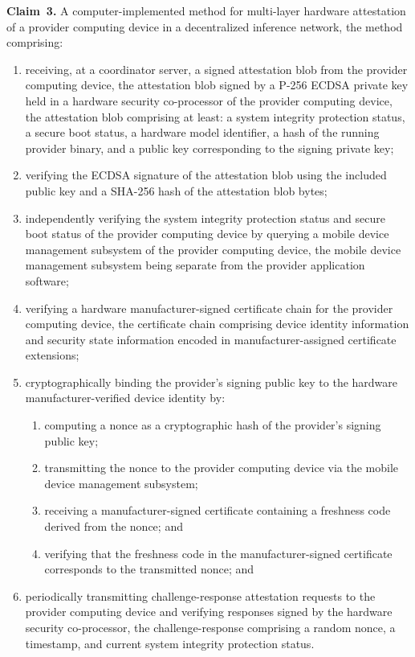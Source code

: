 \documentclass[11pt,letterpaper]{article}
\begin{document}
\textbf{Claim~3.} A computer-implemented method for multi-layer hardware attestation of a provider computing device in a decentralized inference network, the method comprising:

\begin{enumerate}[label=(\alph*),nosep]
\item receiving, at a coordinator server, a signed attestation blob from the provider computing device, the attestation blob signed by a P-256 ECDSA private key held in a hardware security co-processor of the provider computing device, the attestation blob comprising at least: a system integrity protection status, a secure boot status, a hardware model identifier, a hash of the running provider binary, and a public key corresponding to the signing private key;
\item verifying the ECDSA signature of the attestation blob using the included public key and a SHA-256 hash of the attestation blob bytes;
\item independently verifying the system integrity protection status and secure boot status of the provider computing device by querying a mobile device management subsystem of the provider computing device, the mobile device management subsystem being separate from the provider application software;
\item verifying a hardware manufacturer-signed certificate chain for the provider computing device, the certificate chain comprising device identity information and security state information encoded in manufacturer-assigned certificate extensions;
\item cryptographically binding the provider's signing public key to the hardware manufacturer-verified device identity by:
  \begin{enumerate}[label=(\roman*),nosep]
  \item computing a nonce as a cryptographic hash of the provider's signing public key;
  \item transmitting the nonce to the provider computing device via the mobile device management subsystem;
  \item receiving a manufacturer-signed certificate containing a freshness code derived from the nonce; and
  \item verifying that the freshness code in the manufacturer-signed certificate corresponds to the transmitted nonce; and
  \end{enumerate}
\item periodically transmitting challenge-response attestation requests to the provider computing device and verifying responses signed by the hardware security co-processor, the challenge-response comprising a random nonce, a timestamp, and current system integrity protection status.
\end{enumerate}
\end{document}
